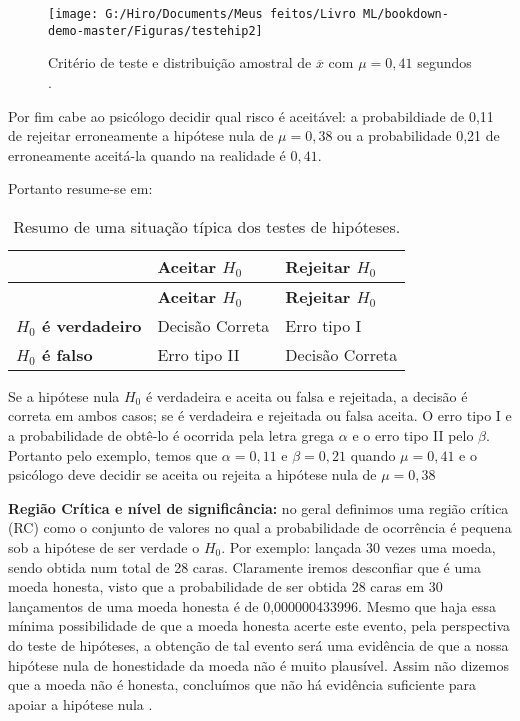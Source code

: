 \documentclass[
  openany]{book}
\begin{document}
\begin{figure}

{\centering \texttt{[image: G:/Hiro/Documents/Meus feitos/Livro ML/bookdown-demo-master/Figuras/testehip2]} 

}

\caption{Critério de teste e distribuição amostral de \(\overline{x}\) com \(\mu =0,41\) segundos \citep{freund2009estatistica}.}\label{fig:testehip2}
\end{figure}



Por fim cabe ao psicólogo decidir qual risco é aceitável: a probabildiade de 0,11 de rejeitar erroneamente a hipótese nula de \(\mu = 0,38\) ou a probabilidade 0,21 de erroneamente aceitá-la quando na realidade é \(0,41\).

Portanto resume-se em:

\begin{longtable}[]{@{}lll@{}}
\caption{\label{tab:tabelahipotese} Resumo de uma situação típica dos testes de hipóteses.}\tabularnewline
\toprule
& \textbf{Aceitar \(H_0\)} & \textbf{Rejeitar \(H_0\)}\tabularnewline
\midrule
\endfirsthead
\toprule
& \textbf{Aceitar \(H_0\)} & \textbf{Rejeitar \(H_0\)}\tabularnewline
\midrule
\endhead
\textbf{\(H_0\) é verdadeiro} & Decisão Correta & Erro tipo I\tabularnewline
\textbf{\(H_0\) é falso} & Erro tipo II & Decisão Correta\tabularnewline
\bottomrule
\end{longtable}

Se a hipótese nula \(H_0\) é verdadeira e aceita ou falsa e rejeitada, a decisão é correta em ambos casos; se é verdadeira e rejeitada ou falsa aceita. O erro tipo I e a probabilidade de obtê-lo é ocorrida pela letra grega \(\alpha\) e o erro tipo II pelo \(\beta\). Portanto pelo exemplo, temos que \(\alpha=0,11\) e \(\beta=0,21\) quando \(\mu=0,41\) e o psicólogo deve decidir se aceita ou rejeita a hipótese nula de \(\mu=0,38\)

\textbf{Região Crítica e nível de significância:} no geral definimos uma região crítica (RC) como o conjunto de valores no qual a probabilidade de ocorrência é pequena sob a hipótese de ser verdade o \(H_0\). Por exemplo: lançada 30 vezes uma moeda, sendo obtida num total de 28 caras. Claramente iremos desconfiar que é uma moeda honesta, visto que a probabilidade de ser obtida 28 caras em 30 lançamentos de uma moeda honesta é de 0,000000433996. Mesmo que haja essa mínima possibilidade de que a moeda honesta acerte este evento, pela perspectiva do teste de hipóteses, a obtenção de tal evento será uma evidência de que a nossa hipótese nula de honestidade da moeda não é muito plausível. Assim não dizemos que a moeda não é honesta, concluímos que não há evidência suficiente para apoiar a hipótese nula \citep{fariaestatistic}.
\end{document}

